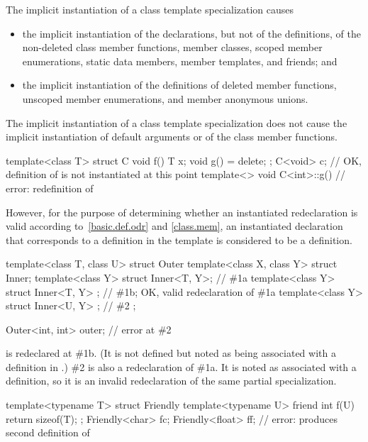 \pnum
The implicit instantiation of a class template specialization causes
\begin{itemize}
\item
  the implicit instantiation of the declarations, but not of the definitions,
  of the non-deleted
  class member functions,
  member classes,
  scoped member enumerations,
  static data members,
  member templates, and
  friends; and
\item
  the implicit instantiation of the definitions of
  deleted member functions,
  unscoped member enumerations, and
  member anonymous unions.
\end{itemize}
The implicit instantiation of a class template specialization
does not cause the implicit instantiation of
default arguments or 
of the class member functions.
\begin{example}
\begin{codeblock}
template<class T>
struct C {
  void f() { T x; }
  void g() = delete;
};
C<void> c;                      // OK, definition of  is not instantiated at this point
template<> void C<int>::g() { } // error: redefinition of 
\end{codeblock}
\end{example}
However, for the purpose of determining whether an instantiated redeclaration
is valid according to~\ref{basic.def.odr} and \ref{class.mem},
an instantiated declaration that corresponds to a definition in the template
is considered to be a definition.
\begin{example}
\begin{codeblock}
template<class T, class U>
struct Outer {
  template<class X, class Y> struct Inner;
  template<class Y> struct Inner<T, Y>;         // \#1a
  template<class Y> struct Inner<T, Y> { };     // \#1b; OK, valid redeclaration of \#1a
  template<class Y> struct Inner<U, Y> { };     // \#2
};

Outer<int, int> outer;                          // error at \#2
\end{codeblock}

 is redeclared at \#1b. (It is not defined
but noted as being associated with a definition in .) \#2
is also a redeclaration of \#1a. It is noted as associated with a definition,
so it is an invalid redeclaration of the same partial specialization.

\begin{codeblock}
template<typename T> struct Friendly {
  template<typename U> friend int f(U) { return sizeof(T); }
};
Friendly<char> fc;
Friendly<float> ff;                             // error: produces second definition of 
\end{codeblock}
\end{example}

